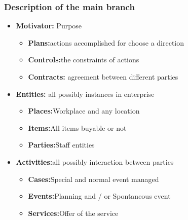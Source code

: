 \documentclass[12pt]{report}
\begin{document}
\subsubsection*{Description of the main branch}
\begin{itemize}
	\item \textbf{Motivator: } Purpose \par

\begin{itemize}
	\item \textbf{ Plans:}actions accomplished for choose a direction\par
	\item \textbf{Controls:}the constraints of actions\par
	\item \textbf{Contracts: }agreement between different parties\par

\end{itemize}
	\item \textbf{Entities: }all possibly instances in  enterprise \par

\begin{itemize}
	\item \textbf{Places:}Workplace and any location\par

	\item \textbf{Items:}All items buyable or not\par

	\item \textbf{Parties:}Staff entities\par


\end{itemize}
	\item \textbf{Activities:}all possibly interaction between parties\par

\begin{itemize}
	\item \textbf{Cases:}Special and normal event managed\par

	\item \textbf{Events:}Planning and / or Spontaneous event\par

	\item \textbf{Services:}Offer of the service\par


\end{itemize}
\end{itemize}
\newpage
\end{document}
